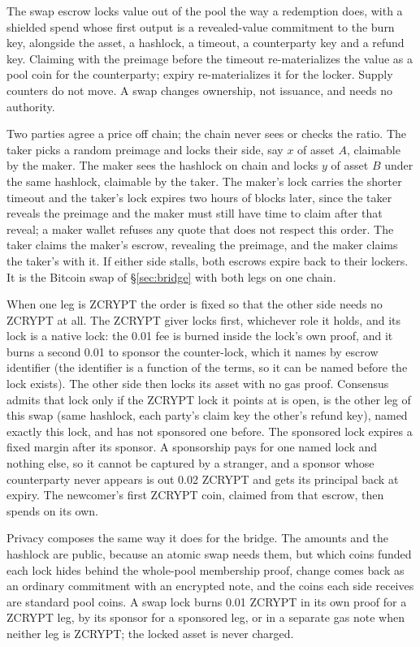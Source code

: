 \documentclass[twocolumn,10pt]{article}
\begin{document}
The swap escrow locks value out of the pool the way a redemption does, with a shielded spend whose first output is a revealed-value commitment to the burn key, alongside the asset, a hashlock, a timeout, a counterparty key and a refund key. Claiming with the preimage before the timeout re-materializes the value as a pool coin for the counterparty; expiry re-materializes it for the locker. Supply counters do not move. A swap changes ownership, not issuance, and needs no authority.

Two parties agree a price off chain; the chain never sees or checks the ratio. The taker picks a random preimage and locks their side, say $x$ of asset $A$, claimable by the maker. The maker sees the hashlock on chain and locks $y$ of asset $B$ under the same hashlock, claimable by the taker. The maker's lock carries the shorter timeout and the taker's lock expires two hours of blocks later, since the taker reveals the preimage and the maker must still have time to claim after that reveal; a maker wallet refuses any quote that does not respect this order. The taker claims the maker's escrow, revealing the preimage, and the maker claims the taker's with it. If either side stalls, both escrows expire back to their lockers. It is the Bitcoin swap of \S\ref{sec:bridge} with both legs on one chain.

When one leg is ZCRYPT the order is fixed so that the other side needs no ZCRYPT at all. The ZCRYPT giver locks first, whichever role it holds, and its lock is a native lock: the 0.01 fee is burned inside the lock's own proof, and it burns a second 0.01 to sponsor the counter-lock, which it names by escrow identifier (the identifier is a function of the terms, so it can be named before the lock exists). The other side then locks its asset with no gas proof. Consensus admits that lock only if the ZCRYPT lock it points at is open, is the other leg of this swap (same hashlock, each party's claim key the other's refund key), named exactly this lock, and has not sponsored one before. The sponsored lock expires a fixed margin after its sponsor. A sponsorship pays for one named lock and nothing else, so it cannot be captured by a stranger, and a sponsor whose counterparty never appears is out 0.02 ZCRYPT and gets its principal back at expiry. The newcomer's first ZCRYPT coin, claimed from that escrow, then spends on its own.

Privacy composes the same way it does for the bridge. The amounts and the hashlock are public, because an atomic swap needs them, but which coins funded each lock hides behind the whole-pool membership proof, change comes back as an ordinary commitment with an encrypted note, and the coins each side receives are standard pool coins. A swap lock burns 0.01 ZCRYPT in its own proof for a ZCRYPT leg, by its sponsor for a sponsored leg, or in a separate gas note when neither leg is ZCRYPT; the locked asset is never charged.
\end{document}

